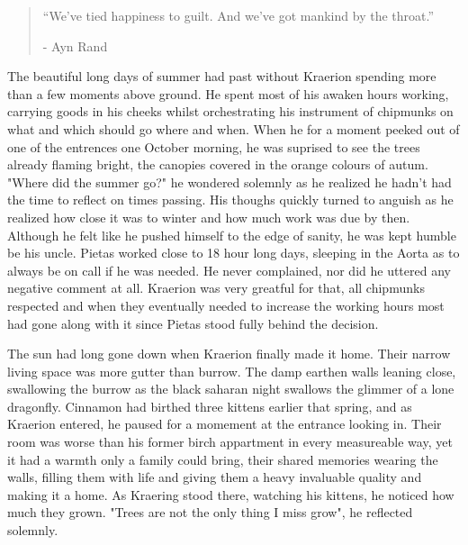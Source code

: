 \documentclass[smalldemyvopaper,11pt,twoside,onecolumn,openright,extrafontsizes]{memoir}
\begin{document}
\vspace{-1.3cm}
\begin{localsize}{10}
  \begin{quote}
    “We've tied happiness to guilt. And we've got mankind by the throat.”
    \begin{flushright}- Ayn Rand \end{flushright}
  \end{quote} 
\end{localsize}
\vspace{1cm}



The beautiful long days of summer had past without Kraerion spending more than a few moments above ground. He spent most of his awaken hours working, carrying goods in his cheeks whilst orchestrating his instrument of chipmunks on what and which should go where and when. When he for a moment peeked out of one of the entrences one October morning, he was suprised to see the trees already flaming bright, the canopies covered in the orange colours of autum. "Where did the summer go?" he wondered solemnly as he realized he hadn't had the time to reflect on times passing. His thoughs quickly turned to anguish as he realized how close it was to winter and how much work was due by then. Although he felt like he pushed himself to the edge of sanity, he was kept humble be his uncle. Pietas worked close to 18 hour long days, sleeping in the Aorta as to always be on call if he was needed. He never complained, nor did he uttered any negative comment at all. Kraerion was very greatful for that, all chipmunks respected and when they eventually needed to increase the working hours most had gone along with it since Pietas stood fully behind the decision.

The sun had long gone down when Kraerion finally made it home. Their narrow living space was more gutter than burrow. The damp earthen walls leaning close, swallowing the burrow as the black saharan night swallows the glimmer of a lone dragonfly. Cinnamon had birthed three kittens earlier that spring, and as Kraerion entered, he paused for a momement at the entrance looking in. Their room was worse than his former birch appartment in every measureable way, yet it had a warmth only a family could bring, their shared memories wearing the walls, filling them with life and giving them a heavy invaluable quality and making it a home. As Kraering stood there, watching his kittens, he noticed how much they grown. "Trees are not the only thing I miss grow", he reflected solemnly.
\end{document}
